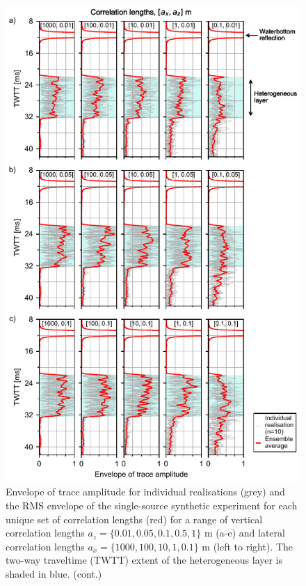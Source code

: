 \documentclass[se,manuscript]{copernicus}
\begin{document}
\begin{figure}
    \includegraphics{figures/si_fig03_pg_1.pdf}
    \caption{Envelope of trace amplitude for individual realisations (grey) and the RMS envelope of the single-source synthetic experiment for each unique set of correlation lengths (red) for a range of vertical correlation lengths $a_z=\{0.01, 0.05, 0.1, 0.5, 1\}$ m (a-e) and lateral correlation lengths $a_x=\{1000, 100, 10, 1, 0.1\}$ \unit{m} (left to right).
    The two-way traveltime (TWTT) extent of the heterogeneous layer is shaded in blue. (cont.)}
    \label{fig:single-source-1}
\end{figure}
\end{document}
